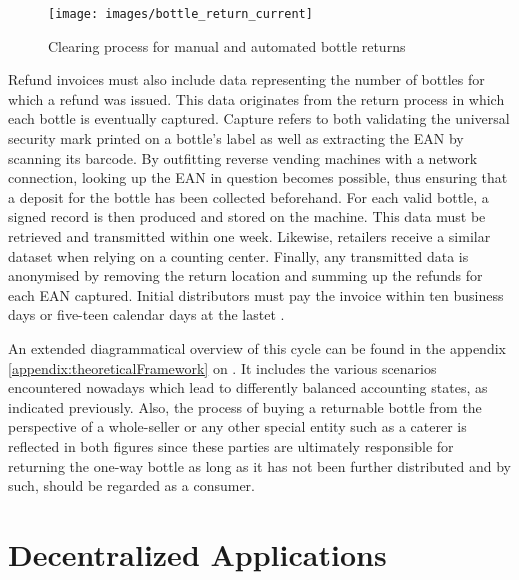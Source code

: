 \begin{figure}[hbt]
	\centering
  	\texttt{[image: images/bottle\_return\_current]}
  	\caption{Clearing process for manual and automated bottle returns \cite[p.~18]{Hartlep2011Recycling}}
  	\label{fig:clearingProcess}
\end{figure}

Refund invoices must also include data representing the number of bottles for which a refund was issued. This data originates from the return process in which each bottle is eventually captured. Capture refers to both validating the universal security mark printed on a bottle’s label as well as extracting the \ac{EAN} by scanning its barcode. By outfitting reverse vending machines with a network connection, looking up the \ac{EAN} in question becomes possible, thus ensuring that a deposit for the bottle has been collected beforehand. For each valid bottle, a signed record is then produced and stored on the machine. This data must be retrieved and transmitted within one week. Likewise, retailers receive a similar dataset when relying on a counting center. Finally, any transmitted data is anonymised by removing the return location and summing up the refunds for each \ac{EAN} captured. Initial distributors must pay the invoice within ten business days or five-teen calendar days at the lastet  \cite[p.~18-19]{Hartlep2011Recycling}.

An extended diagrammatical overview of this cycle can be found in the appendix \autoref{appendix:theoreticalFramework} on . It includes the various scenarios encountered nowadays which lead to differently balanced accounting states, as indicated previously. Also, the process of buying a returnable bottle from the perspective of a whole-seller or any other special entity such as a caterer is reflected in both figures since these parties are ultimately responsible for returning the one-way bottle as long as it has not been further distributed and by such, should be regarded as a consumer.


\pagebreak

\section{Decentralized Applications}

